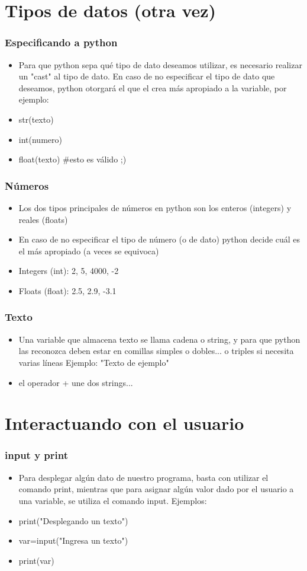 \documentclass[hyperref={pdfpagelabels=false},xcolor=pst,pdf,fragile]{beamer}
\begin{document}
\section{Tipos de datos (otra vez)}
\begin{frame}
    \frametitle{Especificando a python}
    \pause
    \begin{itemize}
    \item Para que python sepa qué tipo de dato deseamos utilizar, es necesario realizar un "cast" al tipo de dato. En caso de no especificar el tipo de dato que deseamos, python otorgará el que el crea más apropiado a la variable, por ejemplo:
    \item str(texto)
    \item int(numero)
    \item float(texto) \pause \#esto es válido ;)
    \end{itemize}
\end{frame}

\begin{frame}
    \frametitle{Números}
    \pause
    \begin{itemize}
    \item Los dos tipos principales de números en python son los enteros (integers) y reales (floats)
    \item En caso de no especificar el tipo de número (o de dato) python decide cuál es el más apropiado (a veces se equivoca)
    \item Integers (int): 2, 5, 4000, -2
    \item Floats (float): 2.5, 2.9, -3.1
    \end{itemize}
\end{frame}

\begin{frame}
    \frametitle{Texto}
    \pause
    \begin{itemize}
    \item Una variable que almacena texto se llama cadena o string, y para que python las reconozca deben estar en comillas simples o dobles... o triples si necesita varias líneas
    Ejemplo: "Texto de ejemplo"
    \item el operador + une dos strings...
    \end{itemize}
\end{frame}

\section{Interactuando con el usuario}
\begin{frame}
    \frametitle{input y print}
    \pause
    \begin{itemize}
    \item Para desplegar algún dato de nuestro programa, basta con utilizar el comando print, mientras que para asignar algún valor dado por el usuario a una variable, se utiliza el comando input. Ejemplos:
    \item print("Desplegando un texto")
    \item var=input("Ingresa un texto")
    \item print(var)
    \end{itemize}
\end{frame}
\end{document}
